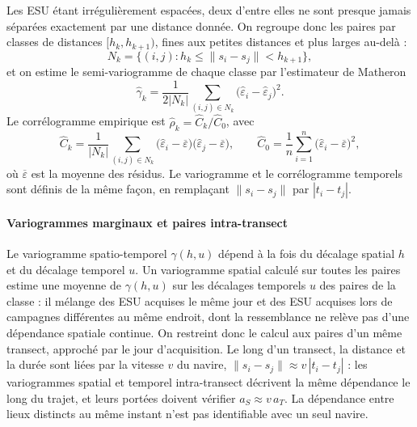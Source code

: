 	Les ESU étant irrégulièrement espacées, deux d'entre elles ne sont presque jamais séparées exactement par une distance donnée. On regroupe donc les paires par classes de distances $[h_k, h_{k+1})$, fines aux petites distances et plus larges au-delà :
	\[
	N_k = \bigl\{(i,j) : h_k \le \|s_i - s_j\| < h_{k+1}\bigr\},
	\]
	et on estime le semi-variogramme de chaque classe par l'estimateur de Matheron
	\begin{equation}\label{eq:variogramme}
		\hat\gamma_k = \frac{1}{2|N_k|} \sum_{(i,j) \in N_k} \bigl(\hat\varepsilon_i - \hat\varepsilon_j\bigr)^2 .
	\end{equation}
	Le corrélogramme empirique est $\hat\rho_k = \hat C_k / \hat C_0$, avec
	\[
	\hat C_k = \frac{1}{|N_k|} \sum_{(i,j) \in N_k} \bigl(\hat\varepsilon_i - \overline{\varepsilon}\bigr)\bigl(\hat\varepsilon_j - \overline{\varepsilon}\bigr),
	\qquad
	\hat C_0 = \frac{1}{n} \sum_{i=1}^{n} \bigl(\hat\varepsilon_i - \overline{\varepsilon}\bigr)^2,
	\]
	où $\overline{\varepsilon}$ est la moyenne des résidus. Le variogramme et le corrélogramme temporels sont définis de la même façon, en remplaçant $\|s_i - s_j\|$ par $|t_i - t_j|$.
		
		\paragraph{Variogrammes marginaux et paires intra-transect}
			Le variogramme spatio-temporel $\gamma(h,u)$ dépend à la fois du décalage spatial $h$ et du décalage temporel $u$. Un variogramme spatial calculé sur toutes les paires estime une moyenne de $\gamma(h,u)$ sur les décalages temporels $u$ des paires de la classe : il mélange des ESU acquises le même jour et des ESU acquises lors de campagnes différentes au même endroit, dont la ressemblance ne relève pas d'une dépendance spatiale continue. On restreint donc le calcul aux paires d'un même transect, approché par le jour d'acquisition. Le long d'un transect, la distance et la durée sont liées par la vitesse $v$ du navire, $\|s_i - s_j\| \approx v\,|t_i - t_j|$ : les variogrammes spatial et temporel intra-transect décrivent la même dépendance le long du trajet, et leurs portées doivent vérifier $a_S \approx v\, a_T$. La dépendance entre lieux distincts au même instant n'est pas identifiable avec un seul navire.
		
